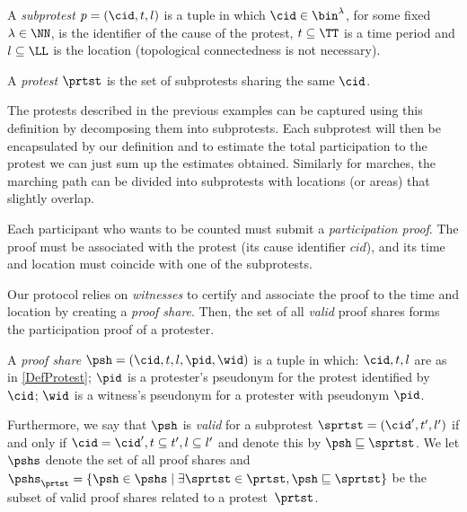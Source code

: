 \begin{definition}\label{DefProtest}
  A \emph{subprotest} \(p = (\cid, t, l)\) is a tuple in which \(\cid\in 
    \bin^{\lambda}\), for some fixed \(\lambda\in \NN\), is the identifier of 
  the cause of the protest, \(t \subseteq \TT\) is a time period and \(l 
    \subseteq \LL\) is the location (topological connectedness is not 
  necessary).

  A \emph{protest} \(\prtst\) is the set of subprotests sharing the same \(\cid\).
\end{definition}

The protests described in the previous examples can be captured using this definition by decomposing them into subprotests.
Each subprotest will then be encapsulated by our definition and to estimate the total participation to the protest we can just sum up the estimates obtained.
Similarly for marches, the marching path can be divided into subprotests with locations (or areas) that slightly overlap.

Each participant who wants to be counted must submit a \emph{participation proof}.
The proof must be associated with the protest (\ie its cause identifier \(cid\)), and its time and location must coincide with one of the subprotests.

Our protocol relies on \emph{witnesses} to certify and associate the proof to the time and location by creating a \emph{proof share}.
Then, the set of all \emph{valid} proof shares forms the participation proof of a protester.


\begin{definition}%
  \label{DefProofShare}\label{DefProofShares}\label{ValidProofShare}
  A \emph{proof share} \(\psh = (\cid, t, l, \pid, \wid)\) is a tuple in which: 
  \(\cid, t, l\) are as in \cref{DefProtest};
  \(\pid\) is a protester's pseudonym for the protest identified by \(\cid\);
  \(\wid\) is a witness's pseudonym for a protester with pseudonym \(\pid\).

  Furthermore, we say that \(\psh\) is \emph{valid} for a subprotest \(\sprtst = (\cid', t', l')\) if and only if \(\cid = \cid', t\subseteq t', l\subseteq l'\) and denote this by 
  \(\psh \sqsubseteq \sprtst\).
  We let \(\pshs\) denote the set of all proof shares and \(
    \pshs_{\prtst} = \{ \psh \in \pshs \mid
      \exists \sprtst \in \prtst, \psh \sqsubseteq \sprtst \}
  \) be the subset of valid proof shares related to a protest~\(\prtst\).
\end{definition}


